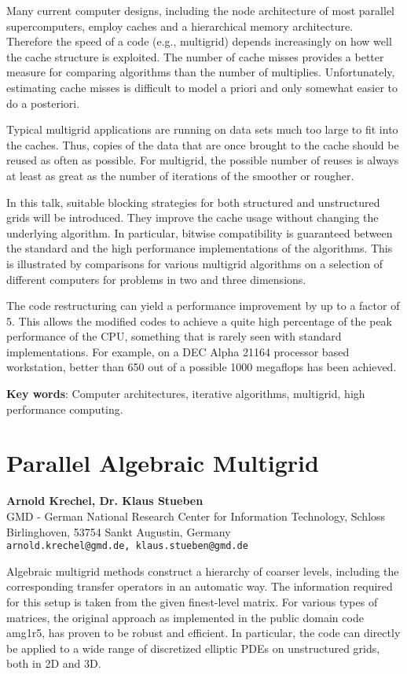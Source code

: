 \documentclass[11pt]{article}
\newcommand{\nextab}[4]{
	\section{#2}
	{\bf #1} \\ \nopagebreak
	{#3} \\ \nopagebreak
	{\tt #4} \nopagebreak
	}
\begin{document}
Many current computer designs, including the node architecture of most
parallel supercomputers, employ caches and a hierarchical memory architecture.
Therefore the speed of a code (e.g., multigrid) depends increasingly on how
well the cache structure is exploited.
The number of cache misses provides a better measure for comparing algorithms
than the number of multiplies.
Unfortunately, estimating cache misses is difficult to model a priori and only
somewhat easier to do a posteriori.

Typical multigrid applications are running on data sets much too large to fit
into the caches.
Thus, copies of the data that are once brought to the cache should be reused
as often as possible.
For multigrid, the possible number of reuses is always at least as great as
the number of iterations of the smoother or rougher.

In this talk, suitable blocking strategies for both structured and
unstructured grids will be introduced.
They improve the cache usage without changing the underlying algorithm.
In particular, bitwise compatibility is guaranteed between the standard and
the high performance implementations of the algorithms.
This is illustrated by comparisons for various multigrid algorithms on a
selection of different computers for problems in two and three dimensions.

The code restructuring can yield a performance improvement by up to a factor
of 5.
This allows the modified codes to achieve a quite high percentage of the peak
performance of the CPU, something that is rarely seen with standard
implementations.
For example, on a DEC Alpha 21164 processor based workstation, better than 650
out of a possible 1000 megaflops has been achieved.

{\bf Key words}:  Computer architectures, iterative algorithms, multigrid,
high performance computing.




\nextab{Arnold Krechel, Dr. Klaus Stueben}
	{Parallel Algebraic Multigrid}
	{GMD - German National Research Center for Information Technology,
	Schloss Birlinghoven, 53754 Sankt Augustin, Germany}
	{arnold.krechel@gmd.de, klaus.stueben@gmd.de}

Algebraic multigrid methods construct a hierarchy of coarser levels,
including the corresponding transfer operators in an automatic way. The
information required for this setup is taken from the given
finest-level matrix. For various types of matrices, the original approach
as implemented in the public domain code amg1r5, has proven to be robust
and efficient.  In particular, the code can directly be applied to a wide
range of discretized elliptic PDEs on unstructured grids, both in 2D and 3D.
\end{document}

